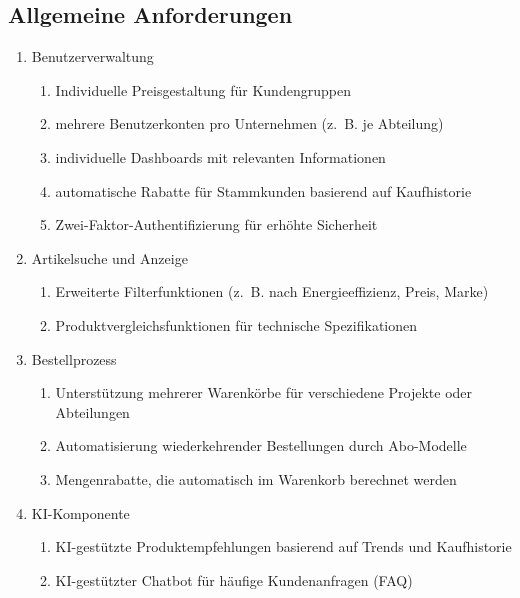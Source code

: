 \documentclass[%
	ngerman,
	12pt,
	a4paper,
	oneside
]{scrbook}
\begin{document}
	\subsection{Allgemeine Anforderungen}
	\begin{enumerate}
		\item Benutzerverwaltung
		\begin{enumerate}
			\item Individuelle Preisgestaltung für Kundengruppen
			\item mehrere Benutzerkonten pro Unternehmen (z.~B. je Abteilung)
			\item individuelle Dashboards mit relevanten Informationen
			\item automatische Rabatte für Stammkunden basierend auf Kaufhistorie
			\item Zwei-Faktor-Authentifizierung für erhöhte Sicherheit
		\end{enumerate}
		\item Artikelsuche und Anzeige
		\begin{enumerate}
			\item Erweiterte Filterfunktionen (z.~B. nach Energieeffizienz, Preis, Marke)
			\item Produktvergleichsfunktionen für technische Spezifikationen
		\end{enumerate}
		\item Bestellprozess
		\begin{enumerate}
			\item Unterstützung mehrerer Warenkörbe für verschiedene Projekte oder Abteilungen
			\item Automatisierung wiederkehrender Bestellungen durch Abo-Modelle
			\item Mengenrabatte, die automatisch im Warenkorb berechnet werden
		\end{enumerate}
		\item KI-Komponente
		\begin{enumerate}
			\item KI-gestützte Produktempfehlungen basierend auf Trends und Kaufhistorie
			\item KI-gestützter Chatbot für häufige Kundenanfragen (FAQ)
		\end{enumerate}
	\end{enumerate}
\end{document}
